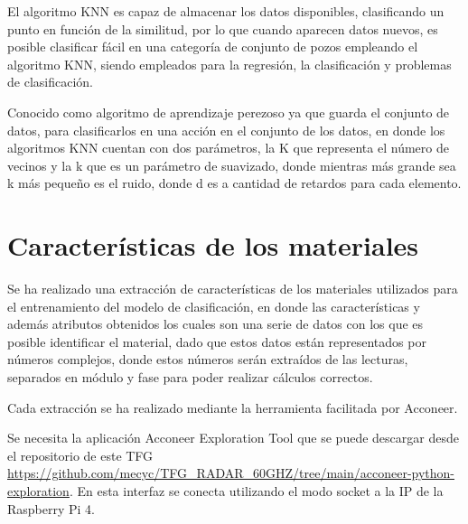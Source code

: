 El algoritmo KNN es capaz de almacenar los datos disponibles, clasificando un punto en función de la similitud, por lo que cuando aparecen datos nuevos, es posible clasificar fácil en una categoría de conjunto de pozos empleando el algoritmo KNN, siendo empleados para la regresión, la clasificación y problemas de clasificación. 

Conocido como algoritmo de aprendizaje perezoso ya que guarda el conjunto de datos, para clasificarlos en una acción en el conjunto de los datos, en donde los algoritmos KNN cuentan con dos parámetros, la K que representa el número de vecinos y la k que es un parámetro de suavizado, donde mientras más grande sea k más pequeño es el ruido, donde d es a cantidad de retardos para cada elemento. 


\section{Características de los materiales}

Se ha realizado una extracción de características de los materiales utilizados para el entrenamiento del modelo de clasificación, en donde las características y además atributos obtenidos los cuales son una serie de datos con los que es posible identificar el material, dado que estos datos están representados por números complejos, donde estos números serán extraídos de las lecturas, separados en módulo y fase para poder realizar cálculos correctos.

Cada extracción se ha realizado mediante la herramienta facilitada por Acconeer.



Se necesita la aplicación Acconeer Exploration Tool que se puede descargar desde el repositorio de este TFG \url{https://github.com/mecyc/TFG_RADAR_60GHZ/tree/main/acconeer-python-exploration}. En esta interfaz se conecta utilizando el modo socket a la IP de la Raspberry Pi 4.
 
